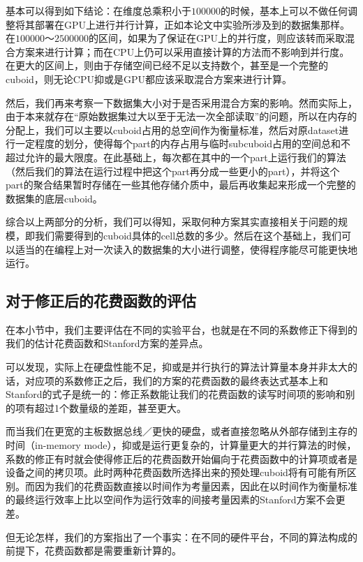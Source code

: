 基本可以得到如下结论：在维度总乘积小于$100000$的时候，基本上可以不做任何调整将其部署在GPU上进行并行计算，正如本论文中实验所涉及到的数据集那样。在$100000$～$2500000$的区间，如果为了保证在GPU上的并行度，则应该转而采取混合方案来进行计算；而在CPU上仍可以采用直接计算的方法而不影响到并行度。在更大的区间上，则由于存储空间已经不足以支持数个，甚至是一个完整的cuboid，则无论CPU抑或是GPU都应该采取混合方案来进行计算。

然后，我们再来考察一下数据集大小对于是否采用混合方案的影响。然而实际上，由于本来就存在“原始数据集过大以至于无法一次全部读取”的问题，所以在内存的分配上，我们可以主要以cuboid占用的总空间作为衡量标准，然后对原dataset进行一定程度的划分，使得每个part的内存占用与临时subcuboid占用的空间总和不超过允许的最大限度。在此基础上，每次都在其中的一个part上运行我们的算法（然后我们的算法在运行过程中把这个part再分成一些更小的part），并将这个part的聚合结果暂时存储在一些其他存储介质中，最后再收集起来形成一个完整的数据集的底层cuboid。

综合以上两部分的分析，我们可以得知，采取何种方案其实直接相关于问题的规模，即我们需要得到的cuboid具体的cell总数的多少。然后在这个基础上，我们可以适当的在编程上对一次读入的数据集的大小进行调整，使得程序能尽可能更快地运行。

\subsection{对于修正后的花费函数的评估}

在本小节中，我们主要评估在不同的实验平台，也就是在不同的系数修正下得到的我们的估计花费函数和Stanford方案的差异点。

可以发现，实际上在硬盘性能不足，抑或是并行执行的算法计算量本身并非太大的话，对应项的系数修正之后，我们的方案的花费函数的最终表达式基本上和Stanford的式子是统一的：修正系数能让我们的花费函数的读写时间项的影响和别的项有超过1个数量级的差距，甚至更大。

而当我们在更宽的主板数据总线／更快的硬盘，或者直接忽略从外部存储到主存的时间（in-memory mode），抑或是运行更复杂的，计算量更大的并行算法的时候，系数的修正有时就会使得修正后的花费函数开始偏向于花费函数中的计算项或者是设备之间的拷贝项。此时两种花费函数所选择出来的预处理cuboid将有可能有所区别。而因为我们的花费函数直接以时间作为考量因素，因此在以时间作为衡量标准的最终运行效率上比以空间作为运行效率的间接考量因素的Stanford方案不会更差。

但无论怎样，我们的方案指出了一个事实：在不同的硬件平台，不同的算法构成的前提下，花费函数都是需要重新计算的。

